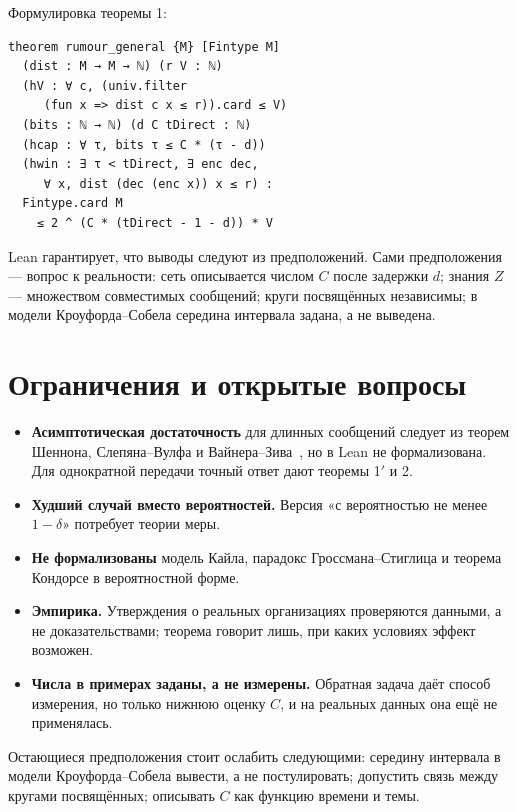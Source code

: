 \documentclass[10pt,a4paper,twocolumn]{article}
\theoremstyle{plain}
\begin{document}
Формулировка теоремы 1:
\begin{Verbatim}[fontsize=\scriptsize,frame=lines,framesep=2mm]
theorem rumour_general {M} [Fintype M]
  (dist : M → M → ℕ) (r V : ℕ)
  (hV : ∀ c, (univ.filter
     (fun x => dist c x ≤ r)).card ≤ V)
  (bits : ℕ → ℕ) (d C tDirect : ℕ)
  (hcap : ∀ τ, bits τ ≤ C * (τ - d))
  (hwin : ∃ τ < tDirect, ∃ enc dec,
     ∀ x, dist (dec (enc x)) x ≤ r) :
  Fintype.card M
    ≤ 2 ^ (C * (tDirect - 1 - d)) * V
\end{Verbatim}

Lean гарантирует, что выводы следуют из предположений. Сами предположения — вопрос к реальности: сеть описывается числом $C$ после задержки $d$; знания $Z$ — множеством совместимых сообщений; круги посвящённых независимы; в модели Кроуфорда–Собела середина интервала задана, а не выведена.

\section{Ограничения и открытые вопросы}

\begin{itemize}
\item \textbf{Асимптотическая достаточность} для длинных сообщений следует из теорем Шеннона, Слепяна–Вулфа и Вайнера–Зива~\cite{shannon,slepianwolf,wynerziv}, но в Lean не формализована. Для однократной передачи точный ответ дают теоремы 1$'$ и 2.
\item \textbf{Худший случай вместо вероятностей.} Версия «с вероятностью не менее $1-\delta$» потребует теории меры.
\item \textbf{Не формализованы} модель Кайла, парадокс Гроссмана–Стиглица и теорема Кондорсе в вероятностной форме.
\item \textbf{Эмпирика.} Утверждения о реальных организациях проверяются данными, а не доказательствами; теорема говорит лишь, при каких условиях эффект возможен.
\item \textbf{Числа в примерах заданы, а не измерены.} Обратная задача даёт способ измерения, но только нижнюю оценку $C$, и на реальных данных она ещё не применялась.
\end{itemize}

Остающиеся предположения стоит ослабить следующими: середину интервала в модели Кроуфорда–Собела вывести, а не постулировать; допустить связь между кругами посвящённых; описывать $C$ как функцию времени и темы.
\end{document}
